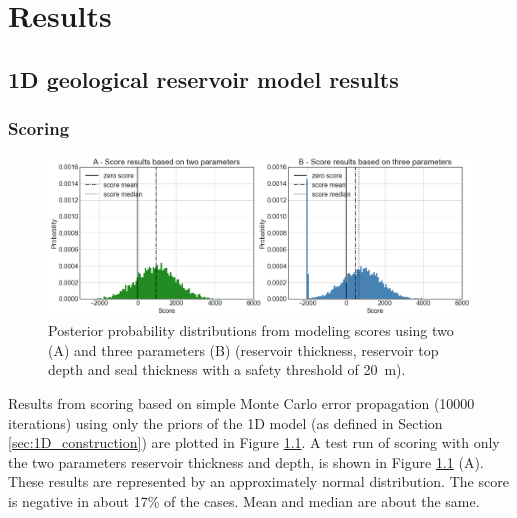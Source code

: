 	\chapter{Results}\label{cha:results}
	
		\section{1D geological reservoir model results}
	
			\subsection{Scoring}
			\begin{figure}[h]
				\centering
				\includegraphics[width=1\textwidth]{Figures/score_results1.png}
				\caption{Posterior probability distributions from modeling scores using two (A) and three parameters (B) (reservoir thickness, reservoir top depth and seal thickness with a safety threshold of 20~m).}\label{fig:score_results1}
			\end{figure}
			Results from scoring based on simple Monte Carlo error propagation (10000 iterations) using only the priors of the 1D model (as defined in Section \ref{sec:1D_construction}) are plotted in Figure \ref{fig:score_results1}. A test run of scoring with only the two parameters reservoir thickness and depth, is shown in Figure \ref{fig:score_results1} (A). These results are represented by an approximately normal distribution. The score is negative in about 17\% of the cases. Mean and median are about the same.\\	
